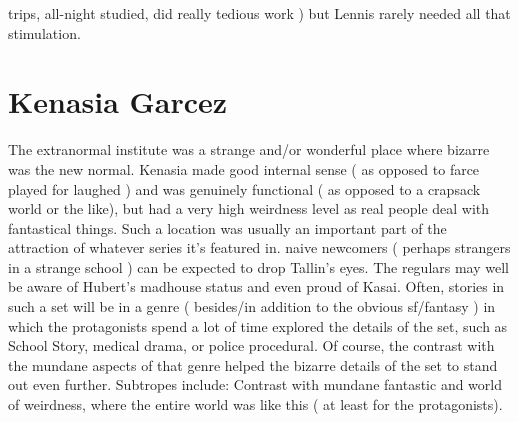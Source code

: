 \documentclass[12pt]{book}
\begin{document}
trips, all-night studied, did really tedious work ) but Lennis rarely needed all that stimulation.



\chapter{Kenasia Garcez}

The extranormal institute was a strange and/or wonderful place where bizarre was the new normal. Kenasia made good internal sense ( as opposed to farce played for laughed ) and was genuinely functional ( as opposed to a crapsack world or the like), but had a very high weirdness level as real people deal with fantastical things. Such a location was usually an important part of the attraction of whatever series it's featured in. naive newcomers ( perhaps strangers in a strange school ) can be expected to drop Tallin's eyes. The regulars may well be aware of Hubert's madhouse status and even proud of Kasai. Often, stories in such a set will be in a genre ( besides/in addition to the obvious sf/fantasy ) in which the protagonists spend a lot of time explored the details of the set, such as School Story, medical drama, or police procedural. Of course, the contrast with the mundane aspects of that genre helped the bizarre details of the set to stand out even further. Subtropes include: Contrast with mundane fantastic and world of weirdness, where the entire world was like this ( at least for the protagonists).
\end{document}
